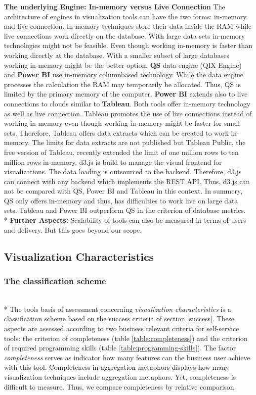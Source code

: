 \textbf{The underlying Engine: In-memory versus Live Connection}
The architecture of engines in visualization tools can have the two forms: in-memory and live connection.
In-memory techniques store their data inside the RAM while live connections work directly on the database. 
With large data sets in-memory technologies might not be feasible. Even though working in-memory is faster than working directly at the database. With a smaller subset of large databases working in-memory might be the better option. 
\textbf{QS} data engine  (QIX Engine) and \textbf{Power BI} use in-memory columnbased technology. While the data engine processes the calculation the RAM may temporarily be allocated. Thus, QS is limited by the primary memory of the computer. \textbf{Power BI} extends also to live connections to clouds similar to \textbf{Tableau}. Both tools offer in-memory technology as well as live connection. Tableau promotes the use of live connections instead of working in-memory even though working in-memory might be faster for small sets. Therefore, Tableau offers data extracts which can be created to work in-memory. The limits for data extracts are not published but Tableau Public, the free version of Tableau, recently extended the limit of one million rows to ten million rows in-memory. 
d3.js is build to manage the visual frontend for visualizations. The data loading is outsourced to the backend. Therefore, d3.js can connect with any backend which implements the REST API. Thus, d3.js can not be compared with QS, Power BI and Tableau in this context. 
In summery, QS only offers in-memory and thus, has difficulties to work live on large data sets. Tableau and Power BI outperform QS in the criterion of database metrics.\\*
\textbf{Further Aspects: }
Scalability of tools can also be measured in terms of users and delivery. But this goes beyond our scope.


\subsection{Visualization Characteristics}

\subsubsection{The classification scheme}\label{tool:classification}\\*
The tools basis of assessment concerning \textit{visualization characteristics} is a classification scheme based on the success criteria of section \ref{success}. These aspects are assessed according to two business relevant criteria for self-service tools: the criterion of completeness  (table \ref{table:completeness}) and the criterion of required programming skills  (table \ref{table:programming-skills}). The factor \textit{completeness} serves as indicator how many features can the business user achieve with this tool. Completeness in aggregation metaphors displays how many visualization techniques include aggregation metaphors. Yet, completeness is difficult to measure. Thus, we compare completeness by relative comparison.

